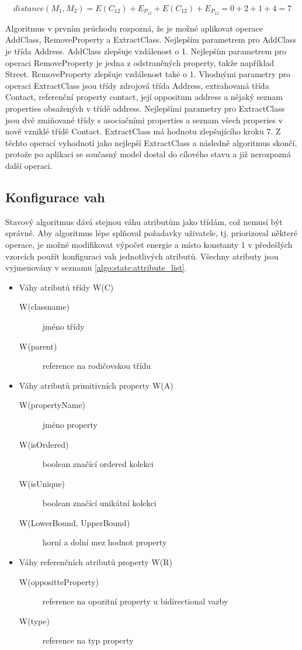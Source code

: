 \documentclass[11pt,twoside,a4paper]{book}
\begin{document}
$$distance(M_1,M_2) = E(C_{12}) + E_{P_{12}} + E(C_{12})
+ E_{P_{12}} = 0 + 2 + 1 + 4 = 7$$

Algoritmus v prvním průchodu rozpozná, že je možné aplikovat operace
AddClass, RemoveProperty a ExtractClass. Nejlepším parametrem pro AddClass je
třída Address. AddClass zlepšuje vzdálenost o 1. Nejlepším parametrem pro
operaci RemoveProperty je jedna z odstraněných property, takže například
Street. RemoveProperty zlepšuje vzdálenost také o 1. Vhodnými
parametry pro operaci ExtractClass jsou třídy zdrojová třída Address,
extrahovaná třída Contact, referenční property contact, její oppositum address a
nějaký seznam properties obsažených v třídě address.
Nejlepšími parametry pro ExtractClass jsou dvě zmiňované třídy s asociačními
properties a seznam všech properies v nově vzniklé třídě Contact. ExtractClass
má hodnotu zlepšujícího kroku 7. Z těchto operací vyhodnotí jako nejlepší
ExtractClass a následně algoritmus skončí, protože po aplikaci se současný
model dostal do cílového stavu a již nerozpozná další operaci.


\subsection{Konfigurace vah}\label{subsec:configurace}
Stavový algoritmus dává stejnou váhu atributům jako třídám, což nemusí být
správné. Aby algoritmus lépe splňoval požadavky uživatele, tj. priorizoval
některé operace, je možné modifikovat výpočet energie a místo konstanty 1 v
předešlých vzorcích použít konfiguraci vah jednotlivých atributů.
Všechny atributy jsou vyjmenovány v seznamu \ref{algo:state:attribute_list}.

\begin{itemize}\label{algo:state:attribute_list}
   \item Váhy atributů třídy W(C)
   \begin{description}
      \item[W(classname)] jméno třídy
      \item[W(parent)] reference na rodičovskou třídu 
   \end{description}
   \item Váhy atributů primitivních property W(A)
   \begin{description}
      \item[W(propertyName)] jméno property
      \item[W(isOrdered)] boolean značící ordered kolekci
      \item[W(isUnique)] boolean značící unikátní kolekci
      \item[W(LowerBound, UpperBound)] horní a dolní mez hodnot property
   \end{description}
   \item Váhy referenčních atributů property W(R)
   \begin{description}
      \item[W(oppositteProperty)] reference na opozitní property u bidirectional
      vazby
      \item[W(type)] reference na typ property
   \end{description}
\end{itemize}
\end{document}
